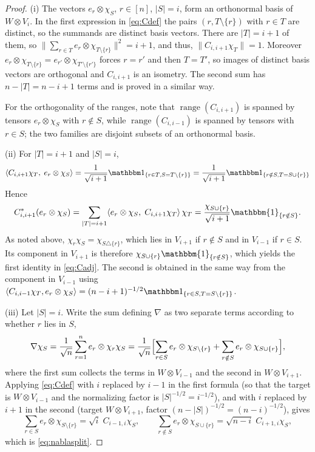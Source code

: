 \documentclass[11pt]{amsart}
\theoremstyle{plain}
\theoremstyle{remark}
\newcommand{\la}{\langle}
\newcommand{\ra}{\rangle}
\begin{document}
\begin{proof}
(i) The vectors $e_r\otimes\chi_S$, $r\in[n]$, $|S|=i$, form an orthonormal
basis of $W\otimes V_i$. In the first expression in \eqref{eq:Cdef} the pairs
$(r,T\setminus\{r\})$ with $r\in T$ are distinct, so the summands are
distinct basis vectors. There are $|T|=i+1$ of them, so
$\bigl\|\sum_{r\in T}e_r\otimes\chi_{T\setminus\{r\}}\bigr\|^2=i+1$,
and thus, $\|C_{i,i+1}\chi_T\|=1$. Moreover
$e_r\otimes\chi_{T\setminus\{r\}}=e_{r'}\otimes\chi_{T'\setminus\{r'\}}$
forces $r=r'$ and then $T=T'$, so images of distinct basis vectors are
orthogonal and $C_{i,i+1}$ is an isometry. The second sum has
$n-|T|=n-i+1$ terms and is proved in a similar way.

For the orthogonality of the ranges, note that $\operatorname{range}(C_{i,i+1})$
is spanned by tensors $e_r\otimes\chi_S$ with $r\notin S$, while
$\operatorname{range}(C_{i,i-1})$ is spanned by tensors with $r\in S$; the two
families are disjoint subsets of an orthonormal basis.

(ii) For $|T|=i+1$ and $|S|=i$,
\[
 \la C_{i,i+1}\chi_T,\;e_r\otimes\chi_S\ra
 =\frac1{\sqrt{i+1}}{\mathbbm 1}_{\{r\in T, S=T\setminus\{r\}\}}
 =\frac1{\sqrt{i+1}}{\mathbbm 1}_{\{r\notin S,T=S\cup\{r\}\}}
\]
Hence
\[
 C^{*}_{i,i+1}(e_r\otimes\chi_S)
 =\sum_{|T|=i+1}\la e_r\otimes\chi_S,\;C_{i,i+1}\chi_T\ra\,\chi_T=
 \dfrac{\chi_{S\cup\{r\}}}{\sqrt{i+1}}\mathbbm{1}_{\{r\notin S\}}.
 \]
As noted above, $\chi_r\chi_S=\chi_{S\triangle\{r\}}$, which lies in $V_{i+1}$ if $r\not\in S$ and
in $V_{i-1}$ if $r\in S$. Its component in $V_{i+1}$ is therefore $\chi_{S\cup\{r\}}\mathbbm{1}_{\{r\notin S\}}$, which yields the first identity in \eqref{eq:Cadj}. 
The second is obtained in the same way from the component in $V_{i-1}$ using
$\la C_{i,i-1}\chi_T,e_r\otimes\chi_S\ra=(n-i+1)^{-1/2}
{\mathbbm 1}_{\{r\in S,T=S\setminus\{r\}\}}$.

(iii) Let $|S|=i$. Write the sum defining $\nabla$ as two separate terms 
according to whether $r$ lies in $S$,
\[
 \nabla\chi_S
 =\frac1{\sqrt n}\sum_{r=1}^{n}e_r\otimes \chi_r\chi_S
 =\frac1{\sqrt n}\Bigl[\sum_{r\in S}e_r\otimes\chi_{S\setminus\{r\}}+
 \sum_{r\notin S}e_r\otimes\chi_{S\cup\{r\}}\Bigr]
,
\]
where the first sum collects the terms in $W\otimes V_{i-1}$ and the second
in $W\otimes V_{i+1}$.
Applying \eqref{eq:Cdef} with $i$ replaced by $i-1$ in the first formula
(so that the target is $W\otimes V_{i-1}$ and the normalizing factor is
$|S|^{-1/2}=i^{-1/2}$), and with $i$ replaced by $i+1$ in the second
(target $W\otimes V_{i+1}$, factor $(n-|S|)^{-1/2}=(n-i)^{-1/2}$), gives
\[
 \sum_{r\in S}e_r\otimes\chi_{S\setminus\{r\}}=\sqrt i\;C_{i-1,i}\chi_S,
 \qquad
 \sum_{r\notin S}e_r\otimes\chi_{S\cup\{r\}}=\sqrt{n-i}\;C_{i+1,i}\chi_S,
\]
which is \eqref{eq:nablasplit}.
\end{proof}
\end{document}
